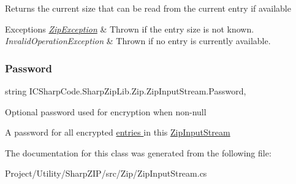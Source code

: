 Returns the current size that can be read from the current entry if available 


\begin{DoxyExceptions}{Exceptions}
{\em \hyperlink{class_i_c_sharp_code_1_1_sharp_zip_lib_1_1_zip_1_1_zip_exception}{Zip\+Exception}} & Thrown if the entry size is not known.\\
\hline
{\em Invalid\+Operation\+Exception} & Thrown if no entry is currently available.\\
\hline
\end{DoxyExceptions}
\mbox{\label{class_i_c_sharp_code_1_1_sharp_zip_lib_1_1_zip_1_1_zip_input_stream_a49de355342270384674e6dbeabd12499}} 
\subsubsection{\texorpdfstring{Password}{Password}}
{\footnotesize\ttfamily string I\+C\+Sharp\+Code.\+Sharp\+Zip\+Lib.\+Zip.\+Zip\+Input\+Stream.\+Password\hspace{0.3cm}{\ttfamily [get]}, {\ttfamily [set]}}



Optional password used for encryption when non-\/null 

A password for all encrypted \hyperlink{class_i_c_sharp_code_1_1_sharp_zip_lib_1_1_zip_1_1_zip_entry}{entries } in this \hyperlink{class_i_c_sharp_code_1_1_sharp_zip_lib_1_1_zip_1_1_zip_input_stream}{Zip\+Input\+Stream}

The documentation for this class was generated from the following file\+:\begin{DoxyCompactItemize}
\item 
Project/\+Utility/\+Sharp\+Z\+I\+P/src/\+Zip/Zip\+Input\+Stream.\+cs\end{DoxyCompactItemize}
